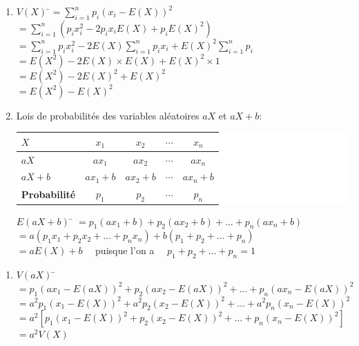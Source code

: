 \documentclass[a4paper,11pt,cours]{nsi} %
\begin{document}
\begin{demonstration}
	\begin{enumerate}[label=\textbullet]
		\item 	\begin{tabbing}
			$V(X)$	\=$=\displaystyle \sum_{i=1}^{n} p_i\left(x_i-E(X)\right)^2$\\[0.5em]
			\>$=\displaystyle \sum_{i=1}^{n} \left(p_i x_i^2-2p_i x_i E(X)+p_i E(X)^2\right)$\\[0.5em]
			\>$=\displaystyle \sum_{i=1}^{n} p_i x_i^2-2E(X)\displaystyle 			\sum_{i=1}^{n} p_i 
			x_i+E(X)^2\displaystyle \sum_{i=1}^{n} p_i$\\[0.5em]
			\>$=E(X^2)-2E(X)\times E(X)+E(X)^2\times1$\\[0.5em]
			\>$=E(X^2)-2E(X)^2+E(X)^2$\\[0.5em]
			\>$=E(X^2)-E(X)^2$
		\end{tabbing}

		\item 	Lois de probabilités des variables aléatoires $aX$ et $aX+b$:
		\begin{center}
			\colorbox{white}{
				\begin{tabular}{|l|c|c|c|c|}
					\hline
					{\boldmath $X$} & $x_1$ & $x_2$ & $\cdots$ & $x_n$\\
					\hline
					{\boldmath $aX$} & $ax_1$ & $ax_2$ & $\cdots$ & $ax_n$\\
					\hline
					{\boldmath $aX+b$} & $ax_1+b$ & $ax_2+b$ & $\cdots$ & $ax_n+b$\\
					\hline
					\textbf{Probabilité} & $p_1$ & $p_2$ & $\cdots$ & $p_n$\\
					\hline
			\end{tabular}}
		\end{center}
		\begin{tabbing}
			$E(aX+b)$	\=	$=p_1(ax_1+b)+p_2(ax_2+b)+\ldots+p_n(ax_n+b)$\\[0.5em]
			\>$=a(p_1x_1+p_2x_2+\ldots+p_n x_n)+b(p_1+p_2+\ldots+p_n)$\\[0.5em]
			\>$=aE(X)+b\quad$  puisque l'on a $\quad p_1+p_2+\ldots+p_n=1$
		\end{tabbing}
	\end{enumerate}
	\begin{enumerate}[label=\textbullet]
		\item 	\begin{tabbing}
			$V(aX)$	\=	  $=p_1\left(ax_1-E(aX)\right)^2+p_2\left(ax_2-E(aX)\right)^2+\ldots+p_n\left(ax_n-E(aX)\right)^2$\\[0.5em]
			\>$=a^2p_1\left(x_1-E(X)\right)^2+a^2p_2\left(x_2-E(X)\right)^2+\ldots+a^2p_n\left(x_n-E(X)\right)^2$\\[0.5em]
			\>$=a^2\left[p_1\left(x_1-E(X)\right)^2+p_2\left(x_2-E(X)\right)^2+\ldots+p_n\left(x_n-E(X)\right)^2\right]$\\[0.5em]
			\>$=a^2V(X)$
		\end{tabbing}
	\end{enumerate}
\end{demonstration}
\end{document}
